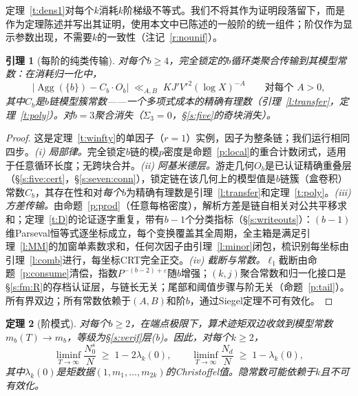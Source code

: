 \documentclass[11pt]{article}
\numberwithin{equation}{section}
\newtheorem{theorem}{定理}[section]
\newtheorem{lemma}[theorem]{引理}
\theoremstyle{definition}
\theoremstyle{remark}
\begin{document}
定理~\ref{t:dens1}对每个$k$消耗$k$阶梯级不等式。我们不将其作为证明段落留下，而是作为定理陈述并写出其证明，使用本文中已陈述的一般阶的统一组件；阶仅作为显示参数出现，不需要$k$的一致性（注记~\ref{r:nounif}）。

\begin{lemma}[每阶的纯类传输]\label{l:pure}
对每个$b\ge4$，完全锁定的$b$循环类聚合传输到其模型常数：在消耗归一化中，
\[
\bigl|\operatorname{Agg}(\{b\})-C_b\cdot O_b\bigr|
\;\ll_{A,B}\;KJ'V'^{2}(\log X)^{-A}
\qquad\text{对每个 }A>0,
\]
其中$C_b$是$b$链模型簇常数——一个多项式成本的精确有理数（引理~\ref{l:transfer}，定理~\ref{t:poly}）。对$b=3$聚合消失（$\Sigma_3=0$，\S\ref{s:five}的奇块消失）。
\end{lemma}

\begin{proof}
这是定理~\ref{t:winfty}的单因子（$r=1$）实例，因子为整条链；我们运行相同四步。\emph{(i) 局部律。}完全锁定$b$链的模$p$密度是命题~\ref{p:local}的重合计数闭式，适用于任意循环长度；无跨块合并。\emph{(ii) 阿基米德层。}游走几何$O_b$是已认证精确重叠层（\S\ref{s:five:cert}，\S\ref{s:seven:conn}），锁定链在该几何上的模型值是$b$链簇（盒卷积）常数$C_b$，其存在性和对\emph{每个}$b$为精确有理数是引理~\ref{l:transfer}和定理~\ref{t:poly}。\emph{(iii) 方差传输。}由命题~\ref{p:prod}（任意每格密度），解析方差是链自相关对公共平移求和；定理~\ref{t:D}的论证逐字重复，带有$b-1$个分类指标（\S\ref{s:writeouts}）：$(b-1)$维Parseval恒等式逐坐标成立，每个变换覆盖其全周期，全主箱是满足引理~\ref{l:MM}的加窗单素数求和，任何次因子由引理~\ref{l:minor}闭包，梳识别每坐标由引理~\ref{l:comb}进行，每坐标CRT完全正交。\emph{(iv) 截断与常数。}$\ell_1$截断由命题~\ref{p:consume}清偿，指数$P^{-(b-2)+\varepsilon}$随$b$增强；$(k,j)$聚合常数和归一化接口是\S\ref{s:fm:R}的存档认证层，与链长无关；尾部和阈值步骤与阶无关（命题~\ref{p:tail}）。所有界双边；所有常数依赖于$(A,B)$和阶$b$，通过Siegel定理不可有效化。
\end{proof}

\begin{theorem}[阶模式]\label{t:schema}
对每个$b\ge2$，在端点极限下，算术迹矩双边收敛到模型常数$m_b(T)\to m_b$，等级为\S\ref{s:verif}层(b)。因此，对每个$k\ge2$，
\[
\liminf_{T\to\infty}\frac{N_0^{s}}{N}\;\ge\;1-2\lambda_k(0),
\qquad
\liminf_{T\to\infty}\frac{N_d}{N}\;\ge\;1-\lambda_k(0),
\]
其中$\lambda_k(0)$是矩数据$(1,m_1,\dots,m_{2k})$的Christoffel值。隐常数可能依赖于$k$且不可有效化。
\end{theorem}
\end{document}
